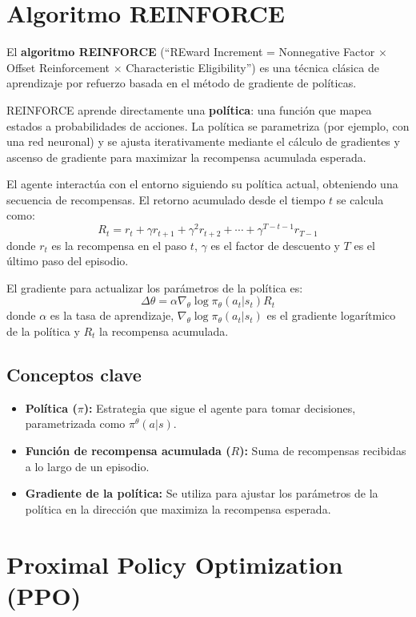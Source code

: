 \section{Algoritmo REINFORCE}

El \textbf{algoritmo REINFORCE} (``REward Increment = Nonnegative Factor $\times$ Offset Reinforcement $\times$ Characteristic Eligibility'') es una técnica clásica de aprendizaje por refuerzo basada en el método de gradiente de políticas.

REINFORCE aprende directamente una \textbf{política}: una función que mapea estados a probabilidades de acciones. La política se parametriza (por ejemplo, con una red neuronal) y se ajusta iterativamente mediante el cálculo de gradientes y ascenso de gradiente para maximizar la recompensa acumulada esperada.

El agente interactúa con el entorno siguiendo su política actual, obteniendo una secuencia de recompensas. El retorno acumulado desde el tiempo $t$ se calcula como:
\[
R_t = r_t + \gamma r_{t+1} + \gamma^2 r_{t+2} + \cdots + \gamma^{T-t-1} r_{T-1}
\]
donde $r_t$ es la recompensa en el paso $t$, $\gamma$ es el factor de descuento y $T$ es el último paso del episodio.

El gradiente para actualizar los parámetros de la política es:
\[
\Delta\theta = \alpha \nabla_\theta \log \pi_\theta(a_t|s_t) R_t
\]
donde $\alpha$ es la tasa de aprendizaje, $\nabla_\theta \log \pi_\theta(a_t|s_t)$ es el gradiente logarítmico de la política y $R_t$ la recompensa acumulada.

\subsection*{Conceptos clave}
\begin{itemize}
    \item \textbf{Política ($\pi$):} Estrategia que sigue el agente para tomar decisiones, parametrizada como $\pi^\theta(a|s)$.
    \item \textbf{Función de recompensa acumulada ($R$):} Suma de recompensas recibidas a lo largo de un episodio.
    \item \textbf{Gradiente de la política:} Se utiliza para ajustar los parámetros de la política en la dirección que maximiza la recompensa esperada.
\end{itemize}


\section{Proximal Policy Optimization (PPO)}

